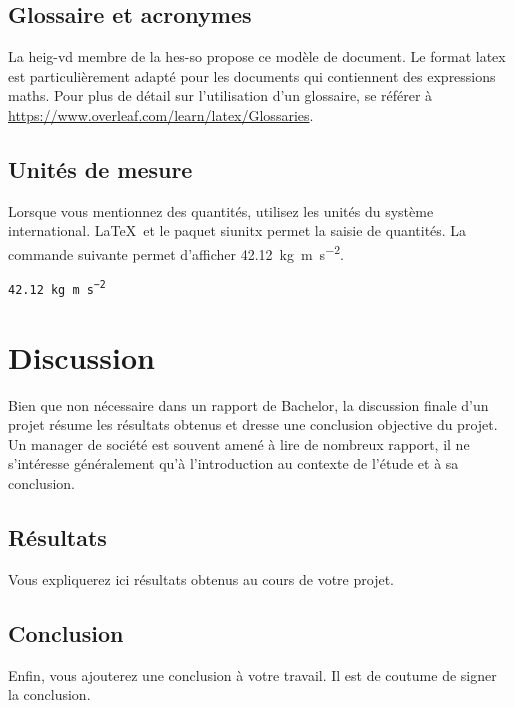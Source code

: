 \documentclass[
    iai, %
    eai, %
    confidential, %
]{heig-tb}
\begin{document}
\section{Glossaire et acronymes}

La \Gls{heig-vd} membre de la \Gls{hes-so} propose ce modèle de document. Le format \Gls{latex} est particulièrement adapté pour les documents qui contiennent des expressions \gls{maths}. Pour plus de détail sur l'utilisation d'un glossaire, se référer à \url{https://www.overleaf.com/learn/latex/Glossaries}.

\section{Unités de mesure}

Lorsque vous mentionnez des quantités, utilisez les unités du système international. \LaTeX~et le paquet \textsf{siunitx} permet la saisie de quantités. La commande suivante permet d'afficher \SI{42.12}{\kilo\gram\metre\per\square\second}.\par

\texttt{\SI{42.12}{\kilo\gram\metre\per\square\second}}\par


\chapter{Discussion}

Bien que non nécessaire dans un rapport de Bachelor, la discussion finale d'un projet résume les résultats obtenus et dresse une conclusion objective du projet. Un manager de société est souvent amené à lire de nombreux rapport, il ne s'intéresse généralement qu'à l'introduction au contexte de l'étude et à sa conclusion.

\section{Résultats}
Vous expliquerez ici résultats obtenus au cours de votre projet.

\section{Conclusion}
Enfin, vous ajouterez une conclusion à votre travail. Il est de coutume de signer la conclusion.

\vfil
\hspace{8cm}\makeatletter\@author\makeatother\par
\hspace{8cm}\begin{minipage}{5cm}
\end{minipage}
\clearpage
\end{document}
